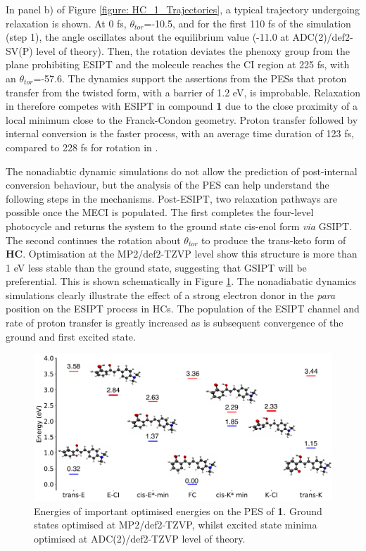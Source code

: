 In panel b) of Figure \ref{figure: HC_1_Trajectories}, a typical trajectory undergoing \Estar{} relaxation is shown. At 0 fs,  $\theta_{tor}$=-10.5\textdegree{}, and for the first 110 fs of the simulation (step 1), the angle oscillates about the equilibrium value (-11.0\textdegree{} at ADC(2)/def2-SV(P) level of theory). Then, the rotation deviates the phenoxy group from the plane prohibiting ESIPT and the molecule reaches the CI region at 225 fs, with an $\theta_{tor}$=-57.6\textdegree{}. The dynamics support the assertions from the \acp{PES} that proton transfer from the twisted \Estar{} form, with a barrier of 1.2 eV, is improbable. Relaxation in \Estar{} therefore competes with ESIPT in compound \textbf{1} due to the close proximity of a local minimum close to the Franck-Condon geometry. Proton transfer followed by internal conversion is the faster process, with an average time duration of 123 fs, compared to 228 fs for rotation in \Estar{}.

The nonadiabtic dynamic simulations do not allow the prediction of post-internal conversion behaviour, but the analysis of the PES can help understand the following steps in the mechanisms. Post-ESIPT, two relaxation pathways are possible once the MECI is populated. The first completes the four-level photocycle and returns the system to the ground state cis-enol form \textit{via} \ac{GSIPT}. The second continues the rotation about $\theta_{tor}$ to produce the trans-keto form of \textbf{HC}.  Optimisation at the MP2/def2-TZVP level show this structure is more than 1 eV less stable than the ground state, suggesting that \ac{GSIPT} will be preferential. This is shown schematically in Figure \ref{figure: HC_1_Energylevels_ADC2}. The nonadiabatic dynamics simulations clearly illustrate the effect of a strong electron donor in the \textit{para} position on the ESIPT process in \ac{HC}s. The population of the ESIPT channel and rate of proton transfer is greatly increased as is subsequent convergence of the ground and first excited state. 

\begin{figure}
\centering
  \includegraphics[width=0.9\linewidth]{3nonradiativedecay/HC_1_energylevels_ADC2.pdf}
  \caption[Energies of important optimised states for \textbf{1}]{Energies of important optimised energies on the \ac{PES} of \textbf{1}. Ground states optimised at MP2/def2-TZVP, whilst excited state minima optimised at ADC(2)/def2-TZVP level of theory.}
  \label{figure: HC_1_Energylevels_ADC2}
\end{figure}

